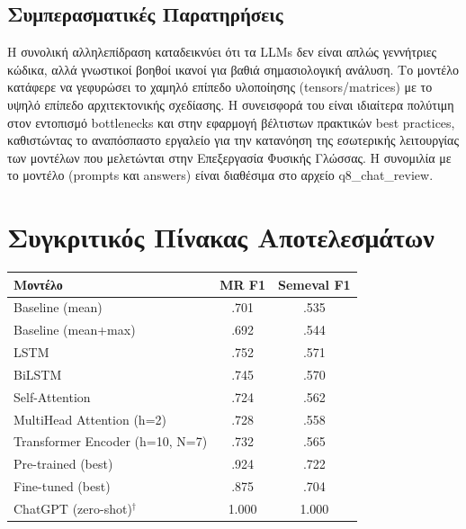\documentclass[12pt]{article}
\begin{document}
\subsection*{Συμπερασματικές Παρατηρήσεις}
Η συνολική αλληλεπίδραση καταδεικνύει ότι τα LLMs δεν είναι απλώς γεννήτριες κώδικα, αλλά γνωστικοί βοηθοί ικανοί για βαθιά σημασιολογική ανάλυση. Το μοντέλο κατάφερε να γεφυρώσει το χαμηλό επίπεδο υλοποίησης (tensors/matrices) με το υψηλό επίπεδο αρχιτεκτονικής σχεδίασης. Η συνεισφορά του είναι ιδιαίτερα πολύτιμη στον εντοπισμό bottlenecks και στην εφαρμογή βέλτιστων πρακτικών best practices, καθιστώντας το αναπόσπαστο εργαλείο για την κατανόηση της εσωτερικής λειτουργίας των μοντέλων που μελετώνται στην Επεξεργασία Φυσικής Γλώσσας. Η συνομιλία με το μοντέλο (prompts και answers) είναι διαθέσιμα στο αρχείο q8_chat_review.

\newpage

\section{Συγκριτικός Πίνακας Αποτελεσμάτων}

\begin{center}
\small
\begin{tabular}{lcc}
\toprule
\textbf{Μοντέλο} & \textbf{MR F1} & \textbf{Semeval F1} \\
\midrule
Baseline (mean) & .701 & .535 \\
Baseline (mean+max) & .692 & .544 \\
LSTM & .752 & .571 \\
BiLSTM & .745 & .570 \\
Self-Attention & .724 & .562 \\
MultiHead Attention (h=2) & .728 & .558 \\
Transformer Encoder (h=10, N=7) & .732 & .565 \\
\midrule
Pre-trained (best) & .924 & .722 \\
Fine-tuned (best) & .875 & .704 \\
\midrule
ChatGPT (zero-shot)$^\dagger$ & 1.000 & 1.000 \\
\bottomrule
\end{tabular}
\end{center}

\vspace{0.8em}
\end{document}

